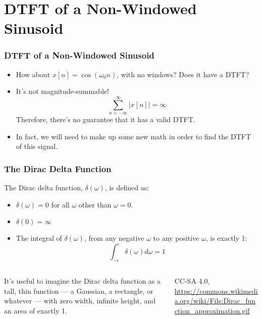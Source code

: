 \documentclass{beamer}
\begin{document}
\section[Non-Windowed]{DTFT of a Non-Windowed Sinusoid}
\setcounter{subsection}{1}

\begin{frame}
  \frametitle{DTFT of a Non-Windowed Sinusoid}

  \begin{itemize}
  \item 
    How about $x[n]=\cos(\omega_0 n)$, with no windows?  Does it have a
    DTFT?
  \item
    It's not magnitude-summable!
    \begin{displaymath}
      \sum_{n=-\infty}^\infty |x[n]| = \infty
    \end{displaymath}
    Therefore, there's no guarantee that it has a valid DTFT.
  \item
    In fact, we will need to make up some new math in order to find
    the DTFT of this signal.
  \end{itemize}
\end{frame}

\begin{frame}
  \frametitle{The Dirac Delta Function}

  The Dirac delta function, $\delta(\omega)$, is defined as:
  \begin{itemize}
  \item $\delta(\omega)=0$ for all $\omega$ other than $\omega=0$.
  \item $\delta(0)=\infty$
  \item The integral of $\delta(\omega)$, from any negative $\omega$
    to any positive $\omega$, is exactly 1:
    \begin{displaymath}
      \int_{-\epsilon}^\epsilon \delta(\omega) d\omega = 1
    \end{displaymath}
  \end{itemize}
\end{frame}

\begin{frame}
  \begin{columns}
    \begin{column}{0.5\textwidth}
      It's useful to imagine the Dirac delta function as a tall, thin
      function --- a Gaussian, a rectangle, or whatever --- with zero
      width, infinite height, and an area of exactly 1.
    \end{column}
    \begin{column}{0.5\textwidth}
      \begin{center}
        
        {\tiny CC-SA 4.0, \url{https://commons.wikimedia.org/wiki/File:Dirac_function_approximation.gif}}
      \end{center}
    \end{column}
  \end{columns}
\end{frame}
\end{document}
